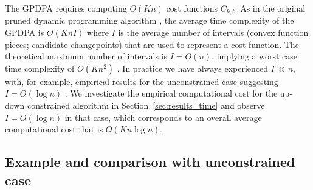 \documentclass[twoside,11pt]{article}
\begin{document}
The GPDPA requires
computing $O(Kn)$ cost functions $C_{k,t}$. As in the original
pruned dynamic programming algorithm \citep{pruned-dp}, the average time
complexity of the GPDPA is $O(K n I)$ where $I$ is the average number of
intervals (convex function pieces; candidate changepoints) that are
used to represent a cost function. The theoretical maximum number of
intervals is $I=O(n)$, implying a worst case time complexity of $O(K n^2)$
\citep{pruned-dp-new}.
In practice we have always experienced $I\ll n$, with, for example,
empirical results for the unconstrained case suggesting $I=O(\log n)$
\citep{fpop}. We investigate the empirical computational cost for the
up-down constrained algorithm in Section~\ref{sec:results_time} and observe $I=O(\log n)$ in that
case, which corresponds to an overall average computational cost that
is $O(Kn\log n)$.

\subsection{Example and comparison with unconstrained case}
\label{sec:example-comparison}
\end{document}
